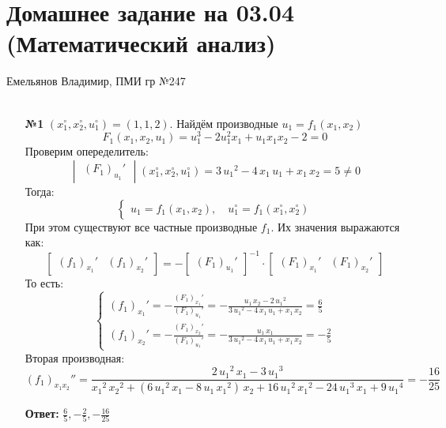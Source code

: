 \documentclass[a4paper]{article}
\newcommand{\matsq}[1]{\begin{bmatrix} #1 \end{bmatrix}}
\newcommand{\vmat}[1]{\begin{vmatrix} #1 \end{vmatrix}}
\renewcommand{\f}[2]{\frac{#1}{#2}}
\newcommand{\case}[1]{\begin{cases} #1 \end{cases}}
\begin{document}
\section*{Домашнее задание на 03.04 (Математический анализ)}
 {\large Емельянов Владимир, ПМИ гр №247}\\\\
\begin{enumerate}
    \item[\textbf{№1}]$(x_1^\circ, x_2^\circ, u_1^\circ) = (1, 1, 2)$. Найдём производные $u_1 = f_1(x_1, x_2)$
    $$F_1(x_1, x_2, u_1) = u_1^3-2u_1^2x_1+u_1x_1x_2 - 2 = 0$$
    Проверим опеределитель:
    $$\vmat{(F_1)_{u_1}'} (x_1^\circ, x_2^\circ, u_1^\circ) 
    = 3\,{u_{1}}^{2}-4\,x_{1}\,u_{1}+x_{1}\,x_{2} = 5 \neq 0$$
    Тогда:
    $$\case{
        u_1 = f_1(x_1, x_2), \quad u_1^\circ = f_1(x_1^\circ, x_2^\circ)
    }$$
    При этом существуют все частные производные $f_1$. Их значения выражаются как:
    $$\matsq{(f_1)_{x_1}' & (f_1)_{x_2}'} =
     - \matsq{(F_1)_{u_1}'}^{-1} \cdot \matsq{(F_1)_{x_1}' & (F_1)_{x_2}'}$$
     То есть:
     $$\case{
        (f_1)_{x_1}' = -\f{(F_1)_{x_1}'}{(F_1)_{u_1}'} =
        - \f{u_{1}\,x_{2}-2\,{u_{1}}^{2}}{3\,{u_{1}}^{2}-4\,x_{1}\,u_{1}+x_{1}\,x_{2}}
        = \f{6}{5} \\

        (f_1)_{x_2}' = -\f{(F_1)_{x_2}'}{(F_1)_{u_1}'} =
        -\f{u_{1}\,x_{1}}{3\,{u_{1}}^{2}-4\,x_{1}\,u_{1}+x_{1}\,x_{2}} = -\f{2}{5}
     }$$
    Вторая производная:
    $$(f_1)_{x_1x_2}'' = \dfrac{2\,{u_{1}}^{2}\,x_{1}-3\,{u_{1}}^{3}}{{x_{1}}^{2}\,{x_{2}}^{2}+\left(6\,{u_{1}}^{2}\,x_{1}-8\,u_{1}\,{x_{1}}^{2}\right)\,x_{2}+16\,{u_{1}}^{2}\,{x_{1}}^{2}-24\,{u_{1}}^{3}\,x_{1}+9\,{u_{1}}^{4}} = -\f{16}{25}$$

    \textbf{Ответ: } $\f{6}{5}, -\f{2}{5}, -\f{16}{25}$


\end{enumerate}
\end{document}
